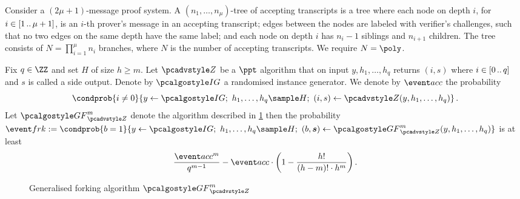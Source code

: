 \begin{definition}
	\label{def:tree_of_accepting_transcripts}
	Consider a $(2\mu + 1)$-message proof system. A $(n_1,
  \ldots, n_\mu)$-tree of accepting transcripts is a tree where each node on
  depth $i$, for $i \in [1 \, .. \, \mu + 1]$, is an $i$-th prover's message in an
  accepting transcript; edges between the nodes are labeled with verifier's
  challenges, such that no two edges on the same depth have the same
  label; and each node on depth $i$ has $n_{i} - 1$ siblings and $n_{i +
    1}$ children. The tree consists of $N = \prod_{i = 1}^\mu n_i$
  branches, where $N$ is the number of accepting transcripts. We require $N = \poly$.
\end{definition}


\begin{lemma}
	\label{lem:generalised_forking_lemma}
	Fix $q \in \ZZ$ and set $H$ of size $h \geq m$. Let $\zdv$ be a $\ppt$
  algorithm that on input $y, h_1, \ldots, h_q$ returns $(i, s)$ where $i \in
  [0 \, .. \, q]$ and $s$ is called a side output. Denote by $\ig$ a randomised
  instance generator. We denote by $\accProb$ the probability
	\[
		\condprob{i \neq 0}{ y \gets \ig;\ h_1, \ldots, h_q \sample H;\ (i, s)
		\gets \zdv(y, h_1, \ldots, h_q)}\,.
	\]
	Let $\genforking_{\zdv}^{m}$ denote the algorithm described in
  \cref{fig:genforking_lemma} then the probability $\frkProb := \condprob{b =
    1}{y \gets \ig;\ h_1, \ldots, h_{q} \sample H;\ (b, \vec{s}) \gets
    \genforking_{\zdv}^{m}(y, h_1, \ldots, h_q)}$ is at least
	\[
		\frac{\accProb^m}{q^{m - 1}} - \accProb \cdot \left(1 -
    \frac{h!}{(h - m)! \cdot h^{m}}\right).
	\]
		
	\begin{figure}[t]
		\centering
	\caption{Generalised forking algorithm $\genforking_{\zdv}^{m}$}
	\label{fig:genforking_lemma}
\end{figure}
\end{lemma}
